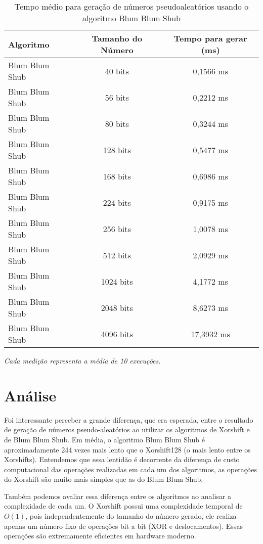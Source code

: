 \begin{table}[H]
\centering
\caption{Tempo médio para geração de números pseudoaleatórios usando o algoritmo Blum Blum Shub}
\label{tab:bbs-performance}
\begin{tabular}{|l|c|c|}
\hline
\textbf{Algoritmo} & \textbf{Tamanho do Número} & \textbf{Tempo para gerar (ms)} \\
\hline
Blum Blum Shub & 40 bits & 0,1566 ms \\
Blum Blum Shub & 56 bits & 0,2212 ms \\
Blum Blum Shub & 80 bits & 0,3244 ms \\
Blum Blum Shub & 128 bits & 0,5477 ms \\
Blum Blum Shub & 168 bits & 0,6986 ms \\
Blum Blum Shub & 224 bits & 0,9175 ms \\
Blum Blum Shub & 256 bits & 1,0078 ms \\
Blum Blum Shub & 512 bits & 2,0929 ms \\
Blum Blum Shub & 1024 bits & 4,1772 ms \\
Blum Blum Shub & 2048 bits & 8,6273 ms \\
Blum Blum Shub & 4096 bits & 17,3932 ms \\
\hline
\end{tabular}
\end{table}

\textit{Cada medição representa a média de 10 execuções.}

\section{Análise}

Foi interessante perceber a grande diferença, que era esperada, entre o resultado de geração de números pseudo-aleatórios ao utilizar os algoritmos de Xorshift e de Blum Blum Shub. Em média, o algoritmo Blum Blum Shub é aproximadamente 244 vezes mais lento que o Xorshift128 (o mais lento entre os Xorshifts). Entendemos que essa lentidão é decorrente da diferença de custo computacional das operações realizadas em cada um dos algoritmos, as operações do Xorshift são muito mais simples que as do Blum Blum Shub.

Também podemos avaliar essa diferença entre os algoritmos ao analisar a complexidade de cada um. O Xorshift possui uma complexidade temporal de $O(1)$, pois independentemente do tamanho do número gerado, ele realiza apenas um número fixo de operações bit a bit (XOR e deslocamentos). Essas operações são extremamente eficientes em hardware moderno.

